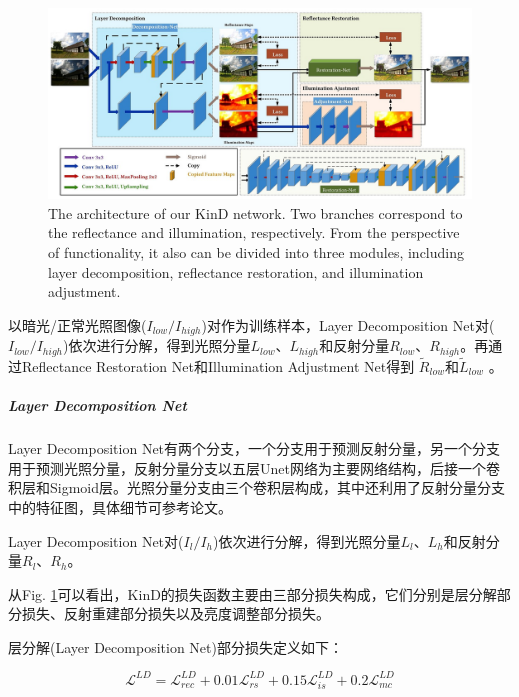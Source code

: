 \documentclass[letterpaper,12pt]{article}
\begin{document}
		\begin{figure}[htbp]
			\centering \includegraphics[width=0.8\columnwidth]{network}
			\captionsetup{font=scriptsize}
			\caption{
				\label{fig: network} %
				The architecture of our KinD network. Two branches correspond to the reflectance and illumination, respectively. From the perspective of functionality, it also can be divided into three modules, including layer decomposition, reflectance restoration, and illumination adjustment.
			}
		\end{figure}
		
		以暗光/正常光照图像($I_{low}/I_{high}$)对作为训练样本，Layer Decomposition Net对($I_{low}/I_{high}$)依次进行分解，得到光照分量$L_{low}$、$L_{high}$和反射分量$R_{low}$、$R_{high}$。再通过Reflectance Restoration Net和Illumination Adjustment Net得到
		$\tilde{R}_{low}$和$\tilde{L}_{low}$
		。
		
			\subparagraph{Layer Decomposition Net}
			
			Layer Decomposition Net有两个分支，一个分支用于预测反射分量，另一个分支用于预测光照分量，反射分量分支以五层Unet网络为主要网络结构，后接一个卷积层和Sigmoid层。光照分量分支由三个卷积层构成，其中还利用了反射分量分支中的特征图，具体细节可参考论文。
			
			Layer Decomposition Net对($I_l / I_h$)依次进行分解，得到光照分量$L_l$、$L_h$和反射分量$R_l$、$R_h$。
			
			从Fig. \ref{fig: network}可以看出，KinD的损失函数主要由三部分损失构成，它们分别是层分解部分损失、反射重建部分损失以及亮度调整部分损失。
			
			层分解(Layer Decomposition Net)部分损失定义如下：
			
			\begin{equation}
				\mathcal{L}^{LD}=\mathcal{L}_{rec}^{LD}+0.01\mathcal{L}_{rs}^{LD}+0.15\mathcal{L}_{is}^{LD}+0.2\mathcal{L}_{mc}^{LD}
			\end{equation}
			
\end{document}
